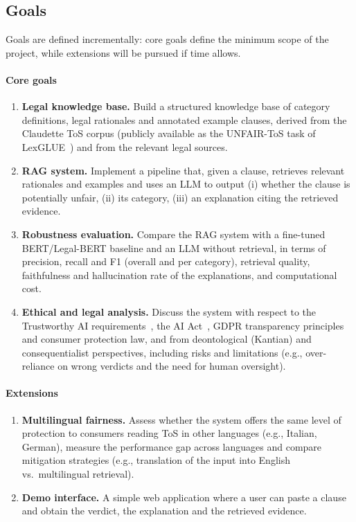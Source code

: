\documentclass[10pt,a4paper]{article}
\begin{document}
\subsection{Goals}
Goals are defined incrementally: core goals define the minimum scope of the project, while extensions will be pursued if time allows.

\paragraph{Core goals}
\begin{enumerate}[label=\textbf{G\arabic*.}]
  \item \textbf{Legal knowledge base.} Build a structured knowledge base of category definitions, legal rationales and annotated example clauses, derived from the Claudette ToS corpus (publicly available as the UNFAIR-ToS task of LexGLUE~\cite{chalkidis2022lexglue}) and from the relevant legal sources.
  \item \textbf{RAG system.} Implement a pipeline that, given a clause, retrieves relevant rationales and examples and uses an LLM to output (i) whether the clause is potentially unfair, (ii) its category, (iii) an explanation citing the retrieved evidence.
  \item \textbf{Robustness evaluation.} Compare the RAG system with a fine-tuned BERT/Legal-BERT baseline and an LLM without retrieval, in terms of precision, recall and F1 (overall and per category), retrieval quality, faithfulness and hallucination rate of the explanations, and computational cost.
  \item \textbf{Ethical and legal analysis.} Discuss the system with respect to the Trustworthy AI requirements~\cite{hleg2019}, the AI Act~\cite{aiact2024}, GDPR transparency principles and consumer protection law, and from deontological (Kantian) and consequentialist perspectives, including risks and limitations (e.g., over-reliance on wrong verdicts and the need for human oversight).
\end{enumerate}

\paragraph{Extensions}
\begin{enumerate}[label=\textbf{E\arabic*.}]
  \item \textbf{Multilingual fairness.} Assess whether the system offers the same level of protection to consumers reading ToS in other languages (e.g., Italian, German), measure the performance gap across languages and compare mitigation strategies (e.g., translation of the input into English vs.\ multilingual retrieval).
  \item \textbf{Demo interface.} A simple web application where a user can paste a clause and obtain the verdict, the explanation and the retrieved evidence.
\end{enumerate}
\end{document}
